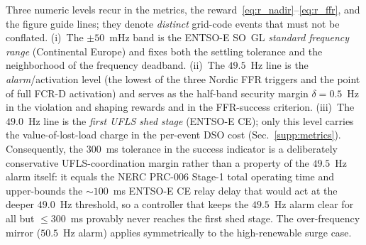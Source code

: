 \documentclass[lettersize,journal]{IEEEtran}
\begin{document}
Three numeric levels recur in the metrics, the reward~\eqref{eq:r_nadir}--\eqref{eq:r_ffr}, and the figure guide lines; they denote \emph{distinct} grid-code events that must not be conflated. (i)~The $\pm50$~mHz band is the ENTSO-E SO~GL \emph{standard frequency range} (Continental Europe) and fixes both the settling tolerance and the neighborhood of the frequency deadband. (ii)~The $49.5$~Hz line is the \emph{alarm}/activation level (the lowest of the three Nordic FFR triggers and the point of full FCR-D activation) and serves as the half-band security margin $\delta=0.5$~Hz in the violation and shaping rewards and in the FFR-success criterion. (iii)~The $49.0$~Hz line is the \emph{first UFLS shed stage} (ENTSO-E CE); only this level carries the value-of-lost-load charge in the per-event DSO cost (Sec.~\ref{supp:metrics}). Consequently, the $300$~ms tolerance in the success indicator is a deliberately conservative UFLS-coordination margin rather than a property of the $49.5$~Hz alarm itself: it equals the NERC PRC-006 Stage-1 total operating time and upper-bounds the ${\sim}100$~ms ENTSO-E CE relay delay that would act at the deeper $49.0$~Hz threshold, so a controller that keeps the $49.5$~Hz alarm clear for all but ${\le}300$~ms provably never reaches the first shed stage. The over-frequency mirror ($50.5$~Hz alarm) applies symmetrically to the high-renewable surge case.
\end{document}
